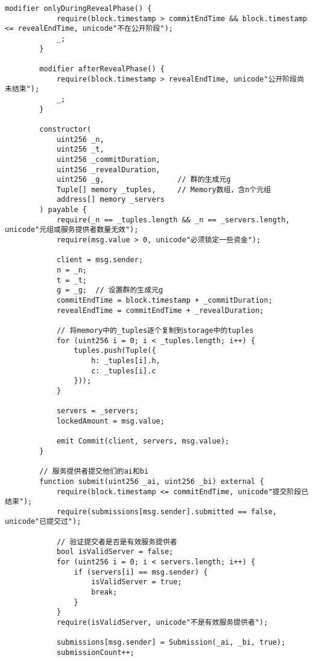 \begin{lstlisting}[language=Solidity]
        modifier onlyDuringRevealPhase() {
            require(block.timestamp > commitEndTime && block.timestamp <= revealEndTime, unicode"不在公开阶段");
            _;
        }
    
        modifier afterRevealPhase() {
            require(block.timestamp > revealEndTime, unicode"公开阶段尚未结束");
            _;
        }
    
        constructor(
            uint256 _n,
            uint256 _t,
            uint256 _commitDuration,
            uint256 _revealDuration,
            uint256 _g,                 // 群的生成元g
            Tuple[] memory _tuples,     // Memory数组，含n个元组
            address[] memory _servers
        ) payable {
            require(_n == _tuples.length && _n == _servers.length, unicode"元组或服务提供者数量无效");
            require(msg.value > 0, unicode"必须锁定一些资金");
    
            client = msg.sender;
            n = _n;
            t = _t;
            g = _g;  // 设置群的生成元g
            commitEndTime = block.timestamp + _commitDuration;
            revealEndTime = commitEndTime + _revealDuration;
            
            // 将memory中的_tuples逐个复制到storage中的tuples
            for (uint256 i = 0; i < _tuples.length; i++) {
                tuples.push(Tuple({
                    h: _tuples[i].h,
                    c: _tuples[i].c
                }));
            }
    
            servers = _servers;
            lockedAmount = msg.value;
    
            emit Commit(client, servers, msg.value);
        }
    
        // 服务提供者提交他们的ai和bi
        function submit(uint256 _ai, uint256 _bi) external {
            require(block.timestamp <= commitEndTime, unicode"提交阶段已结束");
            require(submissions[msg.sender].submitted == false, unicode"已提交过");
    
            // 验证提交者是否是有效服务提供者
            bool isValidServer = false;
            for (uint256 i = 0; i < servers.length; i++) {
                if (servers[i] == msg.sender) {
                    isValidServer = true;
                    break;
                }
            }
            require(isValidServer, unicode"不是有效服务提供者");
    
            submissions[msg.sender] = Submission(_ai, _bi, true);
            submissionCount++;
    

\end{lstlisting}

